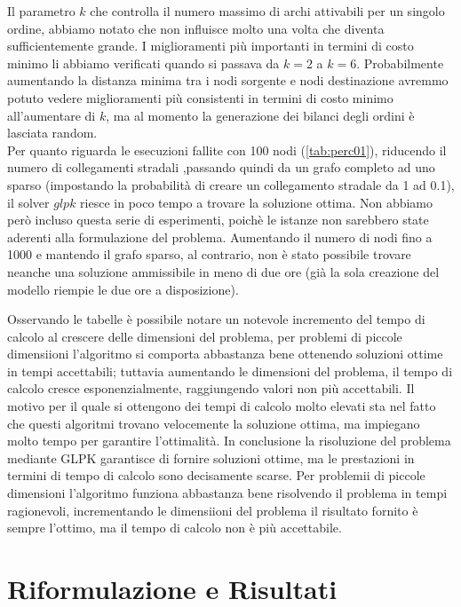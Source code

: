 \documentclass{article}
\begin{document}
Il parametro $k$ che controlla il numero massimo di archi attivabili per un singolo ordine, abbiamo notato che non influisce molto una volta che diventa sufficientemente grande. I miglioramenti più importanti in termini di costo minimo li abbiamo verificati quando si passava da $k = 2$ a $k = 6$. Probabilmente aumentando la distanza minima tra i nodi sorgente e nodi destinazione avremmo potuto vedere miglioramenti più consistenti in termini di costo minimo all'aumentare di $k$, ma al momento la generazione dei bilanci degli ordini è lasciata random.
\\
Per quanto riguarda le esecuzioni fallite con 100 nodi (\cref{tab:perc01}), riducendo il numero di collegamenti stradali ,passando quindi da un grafo completo ad uno sparso (impostando la probabilità di creare un collegamento stradale da 1 ad 0.1), il solver $glpk$ riesce in poco tempo a trovare la soluzione ottima. Non abbiamo però incluso questa serie di esperimenti, poichè le istanze non sarebbero state aderenti alla formulazione del problema. Aumentando il numero di nodi fino a 1000 e mantendo il grafo sparso, al contrario, non è stato possibile trovare neanche una soluzione ammissibile in meno di due ore (già la sola creazione del modello riempie le due ore a disposizione).


Osservando le tabelle è possibile notare un notevole incremento del tempo di calcolo al crescere delle dimensioni del problema, per problemi di piccole dimensiioni l'algoritmo si comporta abbastanza bene ottenendo soluzioni ottime in tempi accettabili; tuttavia aumentando le dimensioni del problema, il tempo di calcolo cresce esponenzialmente, raggiungendo valori non più accettabili. Il motivo per il quale si ottengono dei tempi di calcolo molto elevati sta nel fatto che questi algoritmi trovano velocemente la soluzione ottima, ma impiegano molto tempo per garantire l'ottimalità. In conclusione la risoluzione del problema mediante GLPK garantisce di fornire soluzioni ottime, ma le prestazioni in termini di tempo di calcolo sono decisamente scarse. Per problemii di piccole dimensioni l'algoritmo funziona abbastanza bene risolvendo il problema in tempi ragionevoli, incrementando le dimensiioni del problema il risultato fornito è sempre l'ottimo, ma il tempo di calcolo non è più accettabile. 


\section{Riformulazione e Risultati}
\end{document}
